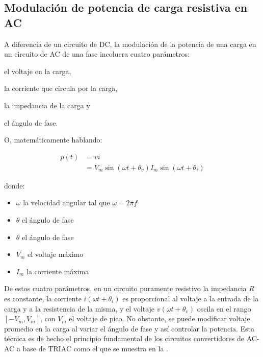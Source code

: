 %
%


\subsection{Modulación de potencia de carga resistiva en AC}%
\label{seq:intro-dimmer}

A diferencia de un circuito de DC, la modulación de la potencia de una carga en un circuito de AC de una fase incolucra cuatro parámetros:
\begin{enumerate*}[label=\roman*\rpar]
	\item el voltaje en la carga,
	\item la corriente que circula por la carga,
	\item la impedancia de la carga
	y
	\item el ángulo de fase.
\end{enumerate*}
O, matemáticamente hablando:

\begin{align}
	p(t) & =vi
	\label{eq:pvi}\\
	  & =
		V_{m}\sin\left(\omega t + \theta_v \right)
		I_{m}\sin\left(\omega t + \theta_i \right)
	\label{eq:pvi-full}
\end{align}

\noindent donde:

\begin{itemize}[noitemsep]
	\item $\omega$ la velocidad angular tal que $\omega = 2 \pi f$
	\item $\theta$ el ángulo de fase
	\item $\theta$ el ángulo de fase
	\item $V_{m}$ el voltaje máximo
	\item $I_{m}$ la corriente máxima
\end{itemize}

De estos cuatro parámetros, en un circuito puramente resistivo la impedancia $R$ es constante, la corriente $i(\omega t + \theta_i)$ es proporcional al voltaje a la entrada de la carga y a la resistencia de la misma, y el voltaje $v(\omega t + \theta_v)$ oscila en el rango $\left[-V_m, V_m\right]$, con $V_m$ el voltaje de pico.
No obstante, se puede modificar voltaje promedio en la carga al variar el ángulo de fase y así controlar la potencia.
Esta técnica es de hecho el principio fundamental de los circuitos convertidores de AC-AC a base de TRIAC como el que se muestra en la .

